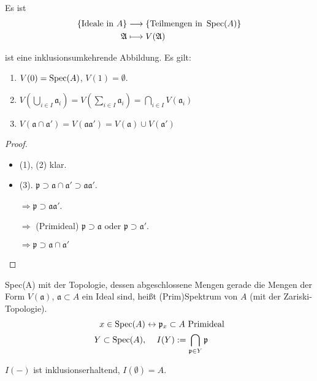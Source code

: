\begin{lem}[1] Es ist
  \begin{align*}
    \{\text{Ideale in }A\} & \longrightarrow\text{\{Teilmengen in }\operatorname{Spec}(A)\}\\
    \mathfrak{A} & \longmapsto V(\mathfrak{A})
  \end{align*}

  ist eine inklusionsumkehrende Abbildung. Es gilt:
  \begin{enumerate}
  \item $V(0)=\operatorname{Spec}(A)$, $V(1)=\emptyset$.
  \item $V\left(\bigcup_{i\in
        I}\mathfrak{a}_{i}\right)=V\left(\sum_{i\in
        I}\mathfrak{a}_{i}\right)=\bigcap_{i\in I}V(\mathfrak{a}_{i})$
  \item
    $V(\mathfrak{a}\cap\mathfrak{a}')=V(\mathfrak{a}\mathfrak{a}')=V(\mathfrak{a})\cup
    V(\mathfrak{a}')$
  \end{enumerate}
\end{lem}
\begin{proof} \mbox{}
  \begin{itemize}
  \item (1), (2) klar.
  \item
    (3). $\mathfrak{p}\supset\mathfrak{a}\cap\mathfrak{a}'\supset\mathfrak{a}\mathfrak{a}'$.

    $\Rightarrow\mathfrak{p}\supset\mathfrak{a}\mathfrak{a}'$.

    $\Rightarrow$ (Primideal) $\mathfrak{p}\supset\mathfrak{a}$ oder
    $\mathfrak{p}\supset\mathfrak{a}'$.

    $\Rightarrow\mathfrak{p}\supset\mathfrak{a}\cap\mathfrak{a}'$

  \end{itemize}
\end{proof}
\begin{defn} Spec(A) mit der Topologie, dessen abgeschlossene Mengen
  gerade die Mengen der Form $V(\mathfrak{a})$,
  $\mathfrak{a}\subset A$ ein Ideal sind, heißt (Prim)Spektrum von $A$
  (mit der Zariski-Topologie).
  \begin{align*}
    x\in\operatorname{Spec}(A) & \leftrightarrow\mathfrak{p}_{x}\subset A\text{ Primideal}\\
    Y\subset\operatorname{Spec}(A), & \phantom{\leftrightarrow\
                              }I(Y):=\bigcap_{\mathfrak{p}\in Y}\mathfrak{p}
  \end{align*}

  $I(-)$ ist inklusionserhaltend, $I(\emptyset)=A$.
\end{defn}
